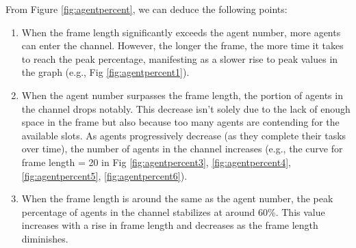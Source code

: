 From Figure \ref{fig:agentpercent}, we can deduce the following points:
\begin{enumerate}
    \item 
    When the frame length significantly exceeds the agent number, more agents can enter the channel. However, the longer the frame, the more time it takes to reach the peak percentage, manifesting as a slower rise to peak values in the graph (e.g., Fig \ref{fig:agentpercent1}).
    \item 
    When the agent number surpasses the frame length, the portion of agents in the channel drops notably. This decrease isn't solely due to the lack of enough space in the frame but also because too many agents are contending for the available slots. As agents progressively decrease (as they complete their tasks over time), the number of agents in the channel increases (e.g., the curve for frame length = 20 in Fig \ref{fig:agentpercent3}, \ref{fig:agentpercent4}, \ref{fig:agentpercent5}, \ref{fig:agentpercent6}).
    \item 
    When the frame length is around the same as the agent number, the peak percentage of agents in the channel stabilizes at around 60\%. This value increases with a rise in frame length and decreases as the frame length diminishes.
\end{enumerate}    

